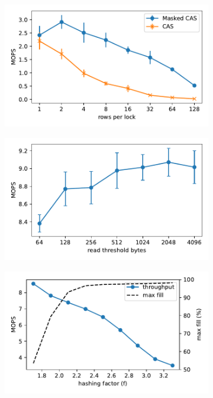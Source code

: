 \begin{figure}[t]
    \centering
    \begin{subfigure}{0.3\linewidth}
        \includegraphics[width=0.99\linewidth]{fig/masked_cas_lock_size.pdf}
    \end{subfigure}
    \begin{subfigure}{0.3\linewidth}
        \includegraphics[width=0.99\linewidth]{fig/read_size.pdf}
    \end{subfigure}
    \begin{subfigure}{0.3\linewidth}
        \includegraphics[width=0.99\linewidth]{fig/factor.pdf}

\end{subfigure}
\end{figure}
